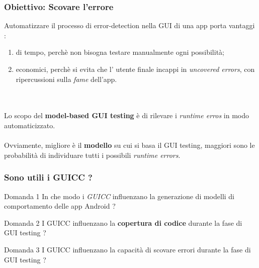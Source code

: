 \documentclass[12pt]{beamer}
\begin{document}
\begin{frame}
\frametitle{Obiettivo: Scovare l'errore}
 
    Automatizzare il processo di error-detection nella GUI di una app porta vantaggi :
    \begin{enumerate}
        \item di tempo, perch\`e non bisogna testare manualmente ogni possibilit\`a;
        \item economici, perch\`e si evita che l' utente finale incappi in \textit{uncovered errors}, con ripercussioni sulla \textit{fame} dell'app.
    \end{enumerate}
    \\~\\
    Lo scopo del \textbf{model-based GUI testing} \`e di rilevare i \textit{runtime erros} in modo automaticizzato.
    \\~\\
    Ovviamente, migliore \`e il \textbf{modello} su cui si basa il GUI testing, maggiori sono le probabilit\`a di individuare tutti i possibili \textit{runtime errors}. 




\end{frame}


\begin{frame}
\frametitle{Sono utili i GUICC ?}

\begin{block}{Domanda 1}
In che modo i \emph{GUICC} influenzano la generazione di modelli di comportamento delle app Android ?
\end{block}

\begin{block}{Domanda 2}
    I GUICC influenzano la \textbf{copertura di codice} durante la fase di GUI testing  ? 
\end{block}

\begin{block}{Domanda 3}
I GUICC influenzano la capacit\`a di scovare errori durante la fase di GUI testing ?
\end{block}


\end{frame}

\end{document}
